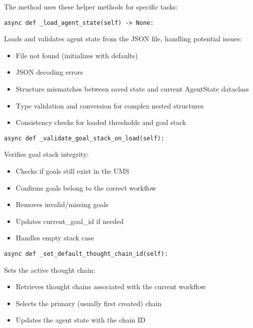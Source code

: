 \documentclass[12pt,a4paper]{article}
\begin{document}
The method uses these helper methods for specific tasks:
\begin{pageablecode}
\begin{verbatim}
async def _load_agent_state(self) -> None:
\end{verbatim}
\end{pageablecode}
Loads and validates agent state from the JSON file, handling potential issues:
\begin{itemize}
    \item File not found (initializes with defaults)
    \item JSON decoding errors
    \item Structure mismatches between saved state and current AgentState dataclass
    \item Type validation and conversion for complex nested structures
    \item Consistency checks for loaded thresholds and goal stack
\end{itemize}

\begin{pageablecode}
\begin{verbatim}
async def _validate_goal_stack_on_load(self):
\end{verbatim}
\end{pageablecode}
Verifies goal stack integrity:
\begin{itemize}
    \item Checks if goals still exist in the UMS
    \item Confirms goals belong to the correct workflow
    \item Removes invalid/missing goals
    \item Updates current\_goal\_id if needed
    \item Handles empty stack case
\end{itemize}

\begin{pageablecode}
\begin{verbatim}
async def _set_default_thought_chain_id(self):
\end{verbatim}
\end{pageablecode}
Sets the active thought chain:
\begin{itemize}
    \item Retrieves thought chains associated with the current workflow
    \item Selects the primary (usually first created) chain
    \item Updates the agent state with the chain ID
\end{itemize}
\end{document}
